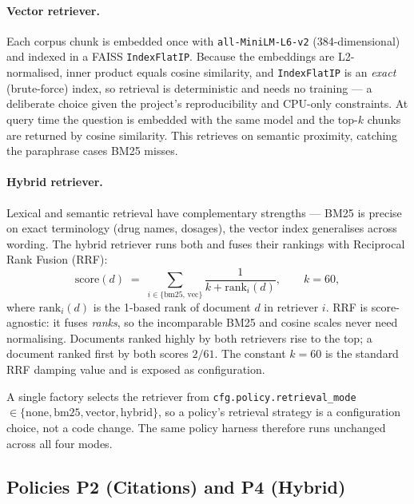 \paragraph{Vector retriever.} Each corpus chunk is embedded once with
\texttt{all-MiniLM-L6-v2} (384-dimensional) and indexed in a FAISS
\texttt{IndexFlatIP}. Because the embeddings are L2-normalised, inner product
equals cosine similarity, and \texttt{IndexFlatIP} is an \emph{exact} (brute-force)
index, so retrieval is deterministic and needs no training --- a deliberate choice
given the project's reproducibility and CPU-only constraints. At query time the
question is embedded with the same model and the top-$k$ chunks are returned by
cosine similarity. This retrieves on semantic proximity, catching the paraphrase
cases BM25 misses.

\paragraph{Hybrid retriever.} Lexical and semantic retrieval have complementary
strengths --- BM25 is precise on exact terminology (drug names, dosages), the
vector index generalises across wording. The hybrid retriever runs both and fuses
their rankings with Reciprocal Rank Fusion (RRF):
%
\begin{equation}
  \mathrm{score}(d) \;=\; \sum_{i \in \{\text{bm25},\,\text{vec}\}}
  \frac{1}{k + \mathrm{rank}_i(d)}, \qquad k = 60,
  \label{eq:rrf}
\end{equation}
%
where $\mathrm{rank}_i(d)$ is the 1-based rank of document $d$ in retriever $i$.
RRF is score-agnostic: it fuses \emph{ranks}, so the incomparable BM25 and cosine
scales never need normalising. Documents ranked highly by both retrievers rise to
the top; a document ranked first by both scores $2/61$. The constant $k=60$ is the
standard RRF damping value and is exposed as configuration.

A single factory selects the retriever from \texttt{cfg.policy.retrieval\_mode}
$\in\{\text{none},\text{bm25},\text{vector},\text{hybrid}\}$, so a policy's
retrieval strategy is a configuration choice, not a code change. The same policy
harness therefore runs unchanged across all four modes.

\subsection{Policies P2 (Citations) and P4 (Hybrid)}
\label{sec:p2-p4}

